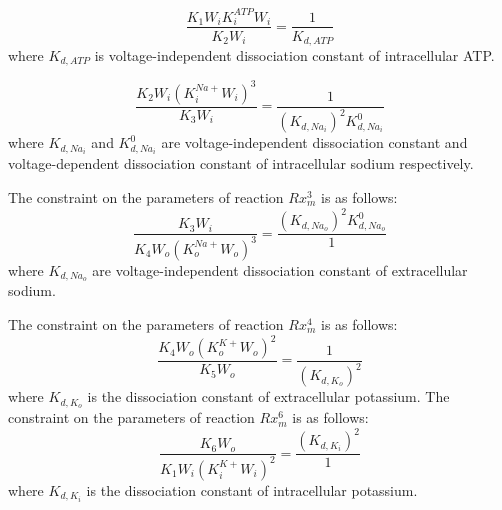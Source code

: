 \begin{equation}
      \label{eq:constraint1_ATP}
\dfrac{K_1W_iK_i^{ATP}W_i}{K_2W_i} = \dfrac{1}{K_{d,ATP}}
\end{equation}
where $K_{d,ATP}$ is voltage-independent dissociation constant of intracellular ATP.

\begin{equation}
      \label{eq:constraint1_Na}
\dfrac{K_2W_i(K_i^{Na+}W_i)^3}{K_3W_i} = \dfrac{1}{(K_{d,Na_i})^2 K_{d,Na_i}^0}
\end{equation}
where $K_{d,Na_i}$ and $K_{d,Na_i}^0$ are voltage-independent dissociation constant and voltage-dependent dissociation constant of intracellular sodium respectively.

The constraint on the parameters of reaction $Rx_m^3$ is as follows:
\begin{equation}
      \label{eq:constraint2}
\dfrac{K_3W_i}{K_4W_o(K_o^{Na+}W_o)^3} = \dfrac{(K_{d,Na_o})^2K_{d,Na_o}^0}{1}
\end{equation}
where $K_{d,Na_o}$ are voltage-independent dissociation constant of extracellular sodium.

The constraint on the parameters of reaction $Rx_m^4$ is as follows:
\begin{equation}
      \label{eq:constraint3}
\dfrac{K_4W_o(K_o^{K+}W_o)^2}{K_5W_o} = \dfrac{1}{(K_{d,K_o})^2}
\end{equation}
where $K_{d,K_o}$ is the dissociation constant of extracellular potassium.
The constraint on the parameters of reaction $Rx_m^6$ is as follows:
\begin{equation}
      \label{eq:constraint4}
\dfrac{K_6W_o}{K_1W_i(K_i^{K+}W_i)^2} = \dfrac{(K_{d,K_i})^2}{1}
\end{equation}
where $K_{d,K_i}$ is the dissociation constant of intracellular potassium.

